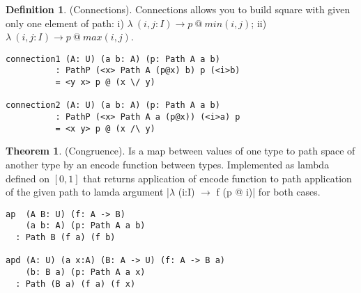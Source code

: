 \documentclass[twoside]{article}
\theoremstyle{definition}
\newtheorem{theorem}{Theorem}
\newtheorem{definition}{Definition}
\begin{document}
\begin{definition} (Connections).
Connections allows you to build square
with given only one element of path: i) $\lambda\ (i,j: I) \rightarrow p\ @\ min(i,j)$;
ii) $\lambda\ (i,j:I) \rightarrow p\ @\ max(i,j)$.
\begin{center}
\end{center}
\begin{lstlisting}
connection1 (A: U) (a b: A) (p: Path A a b)
          : PathP (<x> Path A (p@x) b) p (<i>b)
          = <y x> p @ (x \/ y)

connection2 (A: U) (a b: A) (p: Path A a b)
          : PathP (<x> Path A a (p@x)) (<i>a) p
          = <x y> p @ (x /\ y)
\end{lstlisting}
\end{definition}

\begin{theorem} (Congruence).
Is a map between values of one type
to path space of another type by an encode function between types.
Implemented as lambda defined on $[0,1]$ that returns
application of encode function to path application of
the given path to lamda argument |$\lambda$ (i:I) $\rightarrow$ f (p @ i)|
for both cases.
\begin{lstlisting}
ap  (A B: U) (f: A -> B)
    (a b: A) (p: Path A a b)
  : Path B (f a) (f b)

apd (A: U) (a x:A) (B: A -> U) (f: A -> B a)
    (b: B a) (p: Path A a x)
  : Path (B a) (f a) (f x)
\end{lstlisting}
\end{theorem}
\end{document}
